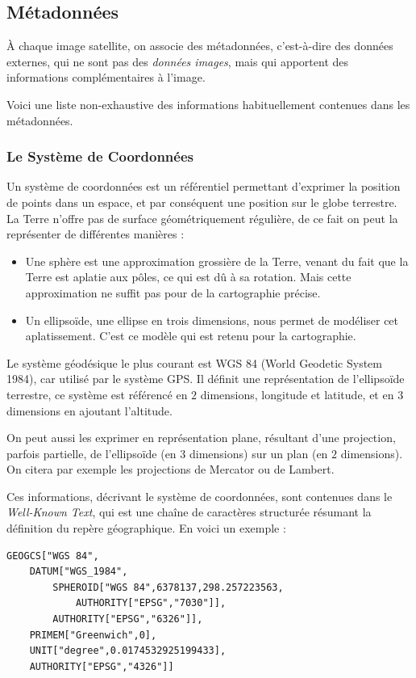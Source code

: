 \documentclass[a4paper, 11pt]{report}
\begin{document}
\subsection{Métadonnées}
À chaque image satellite, on associe des métadonnées, c'est-à-dire des données externes, qui ne sont pas des \emph{données images}, mais qui apportent des informations complémentaires à l'image.

Voici une liste non-exhaustive des informations habituellement contenues dans les métadonnées.
\subsubsection{Le Système de Coordonnées}
Un système de coordonnées est un référentiel permettant d'exprimer la position de points dans un espace, et par conséquent une position sur le globe terrestre.
La Terre n'offre pas de surface géométriquement régulière, de ce fait on peut la représenter de différentes manières :
\begin{itemize}
	\item Une sphère est une approximation grossière de la Terre, venant du fait que la Terre est aplatie aux pôles, ce qui est dû à sa rotation. Mais cette approximation ne suffit pas pour de la cartographie précise.
	\item Un ellipsoïde, une ellipse en trois dimensions, nous permet de modéliser cet aplatissement. C'est ce modèle qui est retenu pour la cartographie.
\end{itemize}

Le système géodésique le plus courant est WGS 84 (World Geodetic System 1984), car utilisé par le système GPS. Il définit une représentation de l'ellipsoïde terrestre, ce système est référencé en $2$ dimensions, longitude et latitude, et en $3$ dimensions en ajoutant l'altitude.

On peut aussi les exprimer en représentation plane, résultant d'une projection, parfois partielle, de l'ellipsoïde (en $3$ dimensions) sur un plan (en $2$ dimensions). On citera par exemple les projections de Mercator ou de Lambert.

Ces informations, décrivant le système de coordonnées, sont contenues dans le \emph{Well-Known Text}, qui est une chaîne de caractères structurée résumant la définition du repère géographique. En voici un exemple :

\begin{verbatim}
GEOGCS["WGS 84",
    DATUM["WGS_1984",
        SPHEROID["WGS 84",6378137,298.257223563,
            AUTHORITY["EPSG","7030"]],
        AUTHORITY["EPSG","6326"]],
    PRIMEM["Greenwich",0],
    UNIT["degree",0.0174532925199433],
    AUTHORITY["EPSG","4326"]]
\end{verbatim}
\end{document}
